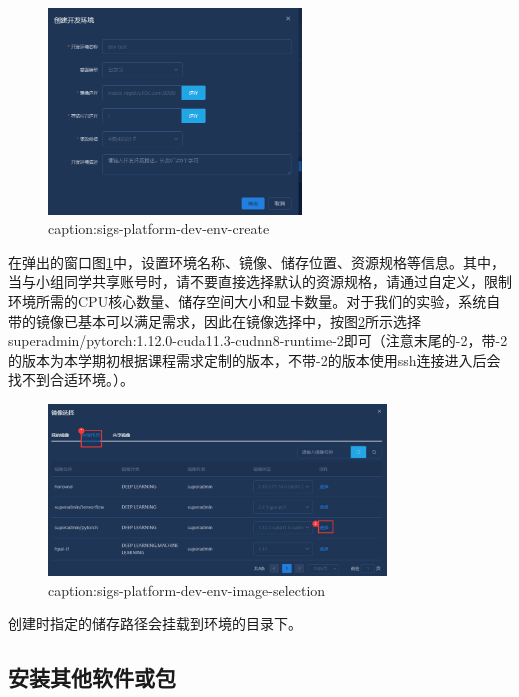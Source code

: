 \begin{figure}[htbp]
	\centering
	\includegraphics[width=0.6\textwidth]{figures/sigs-platform-dev-env-create.png}
	\caption{caption:sigs-platform-dev-env-create}
	\label{fig:sigs-platform-dev-env-create}
\end{figure}
在弹出的窗口图\ref{fig:sigs-platform-dev-env-create}中，设置环境名称、镜像、储存位置、资源规格等信息。其中，当与小组同学共享账号时，请不要直接选择默认的资源规格，请通过自定义，限制环境所需的CPU核心数量、储存空间大小和显卡数量。对于我们的实验，系统自带的镜像已基本可以满足需求，因此在镜像选择中，按图\ref{fig:sigs-platform-dev-env-image-selection}所示选择superadmin/pytorch:1.12.0-cuda11.3-cudnn8-runtime-2即可（注意末尾的-2，带-2的版本为本学期初根据课程需求定制的版本，不带-2的版本使用ssh连接进入后会找不到合适环境。）。


\begin{figure}[htbp]
	\centering
	\includegraphics[width=0.8\textwidth]{figures/sigs-platform-dev-env-image-selection.png}
	\caption{caption:sigs-platform-dev-env-image-selection}
	\label{fig:sigs-platform-dev-env-image-selection}
\end{figure}

创建时指定的储存路径会挂载到环境的目录下。

\subsection{安装其他软件或包}

